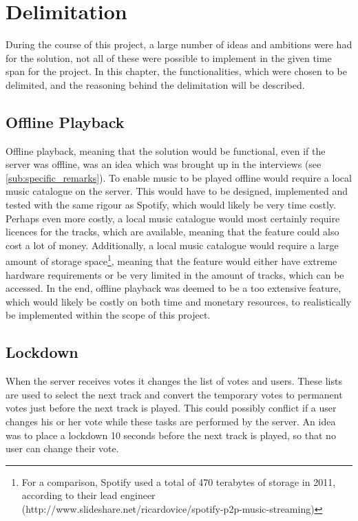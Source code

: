\chapter{Delimitation}
During the course of this project, a large number of ideas and ambitions were had for the solution, not all of these were possible to implement in the given time span for the project. In this chapter, the functionalities, which were chosen to be delimited, and the reasoning behind the delimitation will be described.

\section{Offline Playback}
Offline playback, meaning that the solution would be functional, even if the server was offline, was an idea which was brought up in the interviews (see \cref{sub:specific_remarks}).
To enable music to be played offline would require a local music catalogue on the server. This would have to be designed, implemented and tested with the same rigour as Spotify, which would likely be very time costly.
Perhaps even more costly, a local music catalogue would most certainly require licences for the tracks, which are available, meaning that the feature could also cost a lot of money. Additionally, a local music catalogue would require a large amount of storage space\footnote{For a comparison, Spotify used a total of 470 terabytes of storage in 2011, according to their lead engineer (http://www.slideshare.net/ricardovice/spotify-p2p-music-streaming)}, meaning that the feature would either have extreme hardware requirements or be very limited in the amount of tracks, which can be accessed.
In the end, offline playback was deemed to be a too extensive feature, which would likely be costly on both time and monetary resources, to realistically be implemented within the scope of this project.

\section{Lockdown}
When the server receives votes it changes the list of votes and
users. These lists are used to select the next track and convert the
temporary votes to permanent votes just before the next track is
played. This could possibly conflict if a user changes his or her vote
while these tasks are performed by the server. 
An idea was to place a lockdown 10 seconds before the next track is played, so that no user can change their vote.

